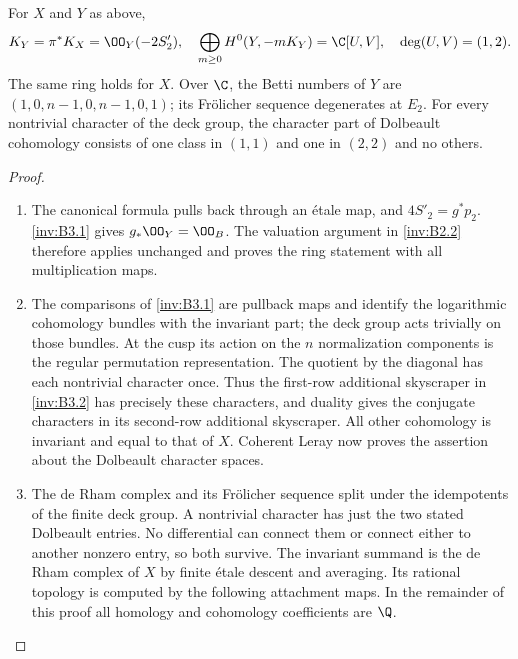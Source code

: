 \begin{proposition}\hypertarget{tag-01S9}{}\label{inv:B3.3}

For $X$ and $Y$ as above,
\[
K_Y=\pi^*K_X=\OO_Y(-2S'_2),\quad
\bigoplus_{m\ge0}H^0(Y,-mK_Y)=\C[U,V],\quad
\deg(U,V)=(1,2).
\]
The same ring holds for $X$.
Over $\C$, the Betti numbers of $Y$ are
$(1,0,n-1,0,n-1,0,1)$; its Fr\"olicher sequence degenerates at $E_2$.
For every nontrivial character of the deck group, the character
part of Dolbeault cohomology consists of one class in $(1,1)$ and
one in $(2,2)$ and no others.
\end{proposition}


\begin{proof}
\begin{enumerate}[label=\arabic*.,leftmargin=*]
\item The canonical formula pulls back through an \'etale map, and
$4S'_2=g^*p_2$. \ref{inv:B3.1} gives $g_*\OO_Y=\OO_B$.
The valuation argument in \ref{inv:B2.2} therefore applies unchanged and proves
the ring statement with all multiplication maps.

\item The comparisons of \ref{inv:B3.1} are pullback maps and identify the logarithmic
cohomology bundles with the invariant part; the deck group acts
trivially on those bundles. At the cusp its action on the $n$
normalization components is the regular permutation representation.
The quotient by the diagonal has each nontrivial character once.
Thus the first-row additional skyscraper in \ref{inv:B3.2} has precisely these
characters, and duality gives the conjugate characters in its
second-row additional skyscraper. All other cohomology is invariant
and equal to that of $X$. Coherent Leray now proves the assertion
about the Dolbeault character spaces.

\item The de Rham complex and its Fr\"olicher sequence split under the
idempotents of the finite deck group. A nontrivial character has just
the two stated Dolbeault entries. No differential can connect them
or connect either to another nonzero entry, so both survive.
The invariant summand is the de Rham complex of $X$ by finite
\'etale descent and averaging. Its rational topology is computed by the following attachment maps. In the remainder of this proof
all homology and cohomology coefficients are $\Q$.


\end{enumerate}
\end{proof}
